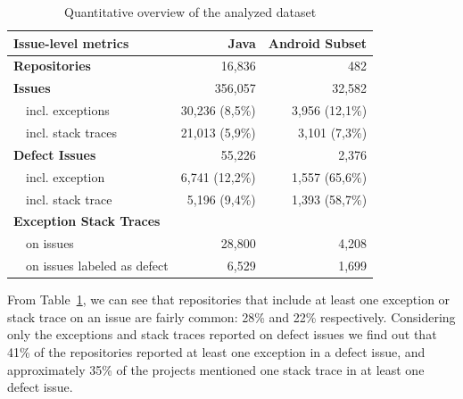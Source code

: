 \documentclass[conference]{IEEEtran}
\begin{document}
\begin{table}
\centering
\begin{tabular}{p{1em}lrr}
\hline
\multicolumn{2}{l}{\bfseries{Issue-level metrics}} & \bfseries{Java} & \bfseries{Android Subset}\\
\hline
   \multicolumn{2}{l}{\bfseries{Repositories}} & 16,836 & 482\\
 \multicolumn{2}{l}{\bfseries{Issues}} & 356,057 & 32,582\\
    & incl. exceptions & 30,236 (8,5\%) & 3,956 (12,1\%) \\
    & incl. stack traces & 21,013 (5,9\%) & 3,101 (7,3\%) \\
 \multicolumn{2}{l}{\bfseries{Defect Issues}} & 55,226 & 2,376 \\
    & incl. exception & 6,741 (12,2\%) & 1,557 (65,6\%) \\
    & incl. stack trace &  5,196 (9,4\%) & 1,393 (58,7\%)\\
\multicolumn{2}{l}{\bfseries{Exception Stack Traces}} &  & \\
    & on issues  & 28,800 & 4,208  \\
    & on issues labeled as defect & 6,529 & 1,699 \\
\hline
\end{tabular}
\caption{Quantitative overview of the analyzed dataset}
\label{tab:overview}
\end{table}

%
From Table~\ref{tab:overview}, we can see that repositories that include at
least one exception or stack trace on an issue are fairly common: 28\% and 22\%
respectively. Considering only the exceptions and stack traces reported on
defect issues we find out that 41\% of the repositories reported at least one
exception in a defect issue, and approximately 35\% of the projects mentioned
one stack trace in at least one defect issue.
\end{document}
